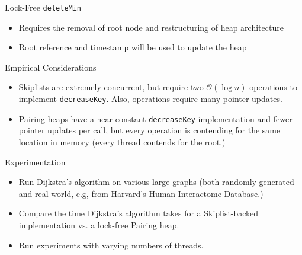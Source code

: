 \documentclass{beamer}
\begin{document}
\begin{frame}{Lock-Free \texttt{deleteMin}}
    \begin{itemize}
    	\item Requires the removal of root node and restructuring of heap architecture
    	\item Root reference and timestamp will be used to update the heap
    \end{itemize}
\end{frame}

\begin{frame}{Empirical Considerations}
  \begin{itemize}
    \item Skiplists are extremely concurrent, but require
      two $\mathcal{O}(\log n)$ operations to implement \texttt{decreaseKey}. Also,
      operations require many pointer updates.
    \item Pairing heaps have a near-constant \texttt{decreaseKey} implementation and fewer
      pointer updates per call, but
      every operation is contending for the same location in memory (every thread contends for the root.)
  \end{itemize}
\end{frame}

\begin{frame}{Experimentation}
  \begin{itemize}
    \item Run Dijkstra's algorithm on various large graphs
      (both randomly generated and real-world, e.g, from Harvard's Human Interactome Database.)
    \item Compare the time Dijkstra's algorithm takes for a Skiplist-backed implementation vs. a lock-free Pairing heap.
    \item Run experiments with varying numbers of threads.
  \end{itemize}
\end{frame}
\end{document}
